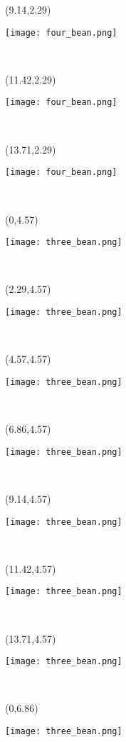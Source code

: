 \documentclass[a4paper]{article}
\newcommand{\myXfourBean}[0]{
\texttt{[image: four\_bean.png]}
}
\newcommand{\myXthreeBean}[0]{
\texttt{[image: three\_bean.png]}
}
\newcommand{\mycard}[5]{%
	\vspace{0.35cm}
	\tiny #1 #2
	\parbox[t][2.29\TPVertModule][c]{0.150\paperwidth}{%
	\hspace{-0.65cm} \large#3\\
	}
}
\begin{document}
\begin{textblock}{2.29}(9.14,2.29)
\mycard{}{}{
\myXfourBean
}{}{} 
\end{textblock}

\begin{textblock}{2.29}(11.42,2.29)
\mycard{}{}{
\myXfourBean
}{}{} 
\end{textblock}

\begin{textblock}{2.29}(13.71,2.29)
\mycard{}{}{
\myXfourBean
}{}{} 
\end{textblock}


\begin{textblock}{2.29}(0,4.57)
\mycard{}{}{
\myXthreeBean
}{}{} 
\end{textblock}

\begin{textblock}{2.29}(2.29,4.57)
\mycard{}{}{
\myXthreeBean
}{}{} 
\end{textblock}

\begin{textblock}{2.29}(4.57,4.57)
\mycard{}{}{
\myXthreeBean
}{}{} 
\end{textblock}

\begin{textblock}{2.29}(6.86,4.57)
\mycard{}{}{
\myXthreeBean
}{}{} 
\end{textblock}

\begin{textblock}{2.29}(9.14,4.57)
\mycard{}{}{
\myXthreeBean
}{}{} 
\end{textblock}

\begin{textblock}{2.29}(11.42,4.57)
\mycard{}{}{
\myXthreeBean
}{}{} 
\end{textblock}

\begin{textblock}{2.29}(13.71,4.57)
\mycard{}{}{
\myXthreeBean
}{}{} 
\end{textblock}


\begin{textblock}{2.29}(0,6.86)
\mycard{}{}{
\myXthreeBean
}{}{} 
\end{textblock}
\end{document}
